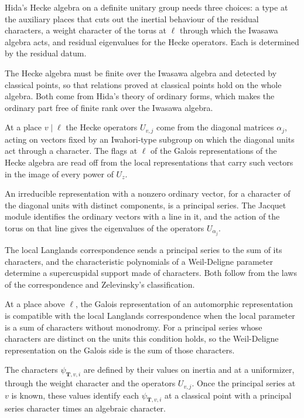 Hida's Hecke algebra on a definite unitary group needs three choices: a type at the auxiliary places that cuts out the inertial behaviour of the residual characters, a weight character of the torus at $\ell$ through which the Iwasawa algebra acts, and residual eigenvalues for the Hecke operators. Each is determined by the residual datum.

The Hecke algebra must be finite over the Iwasawa algebra and detected by classical points, so that relations proved at classical points hold on the whole algebra. Both come from Hida's theory of ordinary forms, which makes the ordinary part free of finite rank over the Iwasawa algebra.

At a place $v\mid\ell$ the Hecke operators $U_{v,j}$ come from the diagonal matrices $\alpha_j$, acting on vectors fixed by an Iwahori-type subgroup on which the diagonal units act through a character. The flags at $\ell$ of the Galois representations of the Hecke algebra are read off from the local representations that carry such vectors in the image of every power of $U_z$.

An irreducible representation with a nonzero ordinary vector, for a character of the diagonal units with distinct components, is a principal series. The Jacquet module identifies the ordinary vectors with a line in it, and the action of the torus on that line gives the eigenvalues of the operators $U_{\alpha_j}$.

The local Langlands correspondence sends a principal series to the sum of its characters, and the characteristic polynomials of a Weil-Deligne parameter determine a supercuspidal support made of characters. Both follow from the laws of the correspondence and Zelevinsky's classification.

At a place above $\ell$, the Galois representation of an automorphic representation is compatible with the local Langlands correspondence when the local parameter is a sum of characters without monodromy. For a principal series whose characters are distinct on the units this condition holds, so the Weil-Deligne representation on the Galois side is the sum of those characters.

The characters $\psi_{\mathbf T,v,i}$ are defined by their values on inertia and at a uniformizer, through the weight character and the operators $U_{v,j}$. Once the principal series at $v$ is known, these values identify each $\psi_{\mathbf T,v,i}$ at a classical point with a principal series character times an algebraic character.

